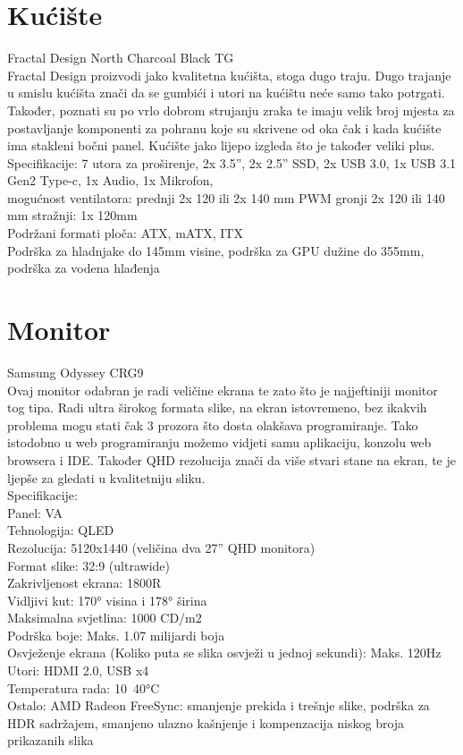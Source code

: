 \documentclass{report}
\begin{document}
\chapter{Kućište}
Fractal Design North Charcoal Black TG
\\Fractal Design proizvodi jako kvalitetna kućišta, stoga dugo traju. Dugo trajanje u smislu kućišta znači da se gumbići i utori na kućištu neće samo tako potrgati. Također, poznati su po vrlo dobrom strujanju zraka te imaju velik broj mjesta za postavljanje komponenti za pohranu koje su skrivene od oka čak i kada kućište ima stakleni bočni panel. Kućište jako lijepo izgleda što je također veliki plus.
\\Specifikacije:
7 utora za proširenje, 2x 3.5”, 2x 2.5” SSD, 2x USB 3.0, 1x USB 3.1 Gen2 Type-c, 1x Audio, 1x Mikrofon, 
\\mogućnost ventilatora: 
prednji 2x 120 ili 2x 140 mm PWM
gronji 2x 120 ili 140 mm
stražnji: 1x 120mm
\\Podržani formati ploča: ATX, mATX, ITX
\\Podrška za hladnjake do 145mm visine, podrška za GPU dužine do 355mm, podrška za vodena hlađenja



\chapter{Monitor}
Samsung Odyssey CRG9
\\Ovaj monitor odabran je radi veličine ekrana te zato što je najjeftiniji monitor tog tipa. Radi ultra širokog formata slike, na ekran istovremeno, bez ikakvih problema mogu stati čak 3 prozora što dosta olakšava programiranje. Tako istodobno u web programiranju možemo vidjeti samu aplikaciju, konzolu web browsera i IDE. Također QHD rezolucija znači da više stvari stane na ekran, te je ljepše za gledati u kvalitetniju sliku.
\\Specifikacije:
\\Panel: VA
\\Tehnologija: QLED
\\Rezolucija: 5120x1440 (veličina dva 27” QHD monitora)
\\Format slike: 32:9 (ultrawide)
\\Zakrivljenost ekrana: 1800R
\\Vidljivi kut: 170° visina i 178° širina
\\Maksimalna svjetlina: 1000 CD/m2
\\Podrška boje: Maks. 1.07 milijardi boja
\\Osvježenje ekrana (Koliko puta se slika osvježi u jednoj sekundi): Maks. 120Hz
\\Utori: HDMI 2.0, USB x4
\\Temperatura rada: 10~40°C
\\Ostalo:
AMD Radeon FreeSync: smanjenje prekida i trešnje slike, podrška za HDR sadržajem, smanjeno ulazno kašnjenje i kompenzacija niskog broja prikazanih slika
\end{document}
